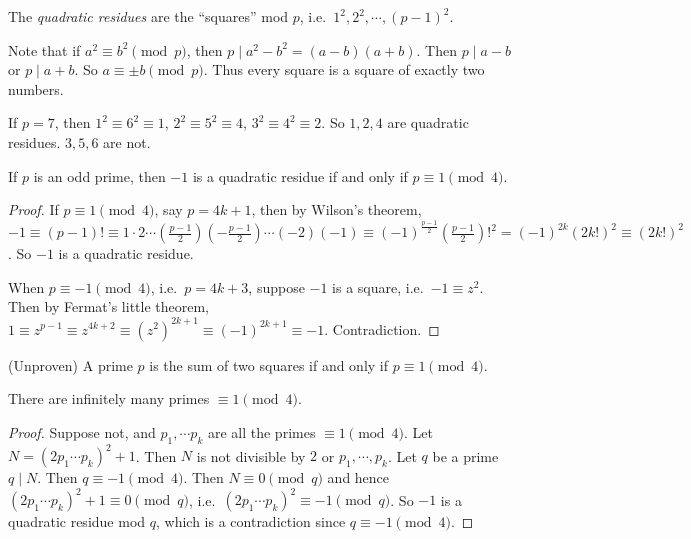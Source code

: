 \documentclass[a4paper]{article}
\begin{document}
\begin{defi}
  The \emph{quadratic residues} are the ``squares'' mod $p$, i.e.\ $1^2, 2^2, \cdots, (p - 1)^2$.
\end{defi}

Note that if $a^2 \equiv b^2\pmod p$, then $p \mid a^2 - b^2 = (a - b)(a + b)$. Then $p \mid a - b$ or $p \mid a + b$. So $a\equiv \pm b\pmod p$. Thus every square is a square of exactly two numbers.

\begin{eg}
  If $p = 7$, then $1^2 \equiv 6^2 \equiv 1$, $2^2 \equiv 5^2 \equiv 4$, $3^2 \equiv 4^2 \equiv 2$. So $1, 2, 4$ are quadratic residues. $3, 5, 6$ are not.
\end{eg}

\begin{prop}
  If $p$ is an odd prime, then $-1$ is a quadratic residue if and only if $p\equiv 1\pmod 4$.
\end{prop}

\begin{proof}
  If $p \equiv 1 \pmod 4$, say $p = 4k + 1$, then by Wilson's theorem, $-1 \equiv (p - 1)!\equiv 1\cdot 2\cdots \left(\frac{p - 1}{2}\right)\left(-\frac{p - 1}{2}\right)\cdots (-2)(-1)\equiv (-1)^{\frac{p - 1}{2}}\left(\frac{p - 1}{2}\right)!^2 = (-1)^{2k}(2k!)^2 \equiv (2k!)^2$. So $-1$ is a quadratic residue.

  When $p \equiv -1\pmod 4$, i.e.\ $p = 4k + 3$, suppose $-1$ is a square, i.e.\ $-1 \equiv z^2$. Then by Fermat's little theorem, $1\equiv z^{p - 1} \equiv z^{4k+ 2}\equiv (z^2)^{2k + 1} \equiv (-1)^{2k + 1}\equiv -1$. Contradiction.
\end{proof}
\begin{prop}
  (Unproven) A prime $p$ is the sum of two squares if and only if $p\equiv 1\pmod 4$.
\end{prop}

\begin{prop}
  There are infinitely many primes $\equiv 1\pmod 4$.
\end{prop}

\begin{proof}
  Suppose not, and $p_1, \cdots p_k$ are all the primes $\equiv 1\pmod 4$. Let $N = (2p_1\cdots p_k)^2 + 1$. Then $N$ is not divisible by $2$ or $p_1,\cdots, p_k$. Let $q$ be a prime $q \mid N$. Then $q \equiv -1\pmod 4$. Then $N \equiv 0\pmod q$ and hence $(2p_1\cdots p_k)^2 + 1\equiv 0\pmod q$, i.e.\ $(2p_1\cdots p_k)^2 \equiv -1\pmod q$. So $-1$ is a quadratic residue mod $q$, which is a contradiction since $q \equiv -1\pmod 4$.
\end{proof}
\end{document}

